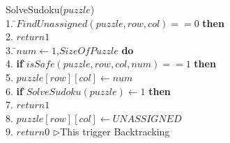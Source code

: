 \documentclass[12pt, letterpaper, twoside]{article}
\begin{document}
            \begin{center}
            \begin{tabbing}
            SolveSudoku($puzzle$) \\
            1.  \=$FindUnassigned(puzzle, row, col ) == 0 $ {\bf then} \\
            2. \indent            \> $return 1$ \\
            3.  \=$num \leftarrow 1$,$SizeOfPuzzle$ {\bf do} \\
            4. \indent            \> {\bf if} \=$isSafe(puzzle, row,col,num) == 1$ {\bf then} \\
            5. \indent            \>		 \>$puzzle[row][col] \leftarrow num $ \\
            6. \indent            \>            \> {\bf if} \=$SolveSudoku(puzzle) \leftarrow 1$ {\bf then} \\
            7. \indent            \>            \> 	\>$return 1$ \\
            8. \indent            \> 	 \>$puzzle[row][col] \leftarrow UNASSIGNED$ \\
            9. \indent $return  0$      \>\>\> $\rhd$This trigger Backtracking \\ \\ \\ \\ \\ \\ \\ \\ \\ \\ \\ \\ \\   \\ \\ \\ \\ \\ \\ \\ \\ \\ \\
            \end{tabbing}
            \label{fig_alg_ex}
            \end{center}
\end{document}
